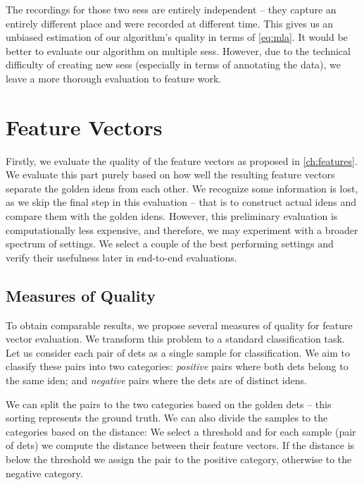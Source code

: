 The recordings for those two \glspl{ses} are entirely independent -- they
capture an entirely different place and were recorded at different time. This gives
us an unbiased estimation of our algorithm's quality in terms of
\autoref{eq:mla}. It would be better to evaluate our algorithm on multiple
\glspl{ses}. However, due to the technical difficulty of creating new \glspl{ses}
(especially in terms of annotating the data), we leave a more thorough evaluation
to feature work.

\section{Feature Vectors}

\label{sec:eval_fv}

Firstly, we evaluate the
quality of the feature vectors as proposed in \autoref{ch:features}. We evaluate this part purely based on how well the resulting feature vectors
separate the golden \glspl{iden} from each other. We recognize some
information is lost, as we skip the final step in this evaluation -- that is to
construct actual \glspl{iden} and compare them with the golden \glspl{iden}.
However, this preliminary evaluation is computationally less expensive, and
therefore, we may experiment with a broader spectrum of settings. We select a couple of the best performing settings and verify their usefulness later
in end-to-end evaluations.

\subsection{Measures of Quality}

To obtain comparable results, we propose several measures of quality for feature vector evaluation. We transform this problem to a standard classification task. Let us consider each pair of \glspl{det} as a single sample for classification. We aim to classify these pairs into two categories: \emph{positive} pairs where both \glspl{det} belong to the same \gls{iden}; and \emph{negative} pairs where the \glspl{det} are of distinct \glspl{iden}.

We can split the pairs to the two categories based on the golden \glspl{det} -- this sorting represents the ground truth. We can also divide the samples to the categories based on the distance: We select a threshold and for each sample (pair of \glspl{det}) we compute the distance between their feature vectors. If the distance is below the threshold we assign the pair to the positive category, otherwise to the negative category.

